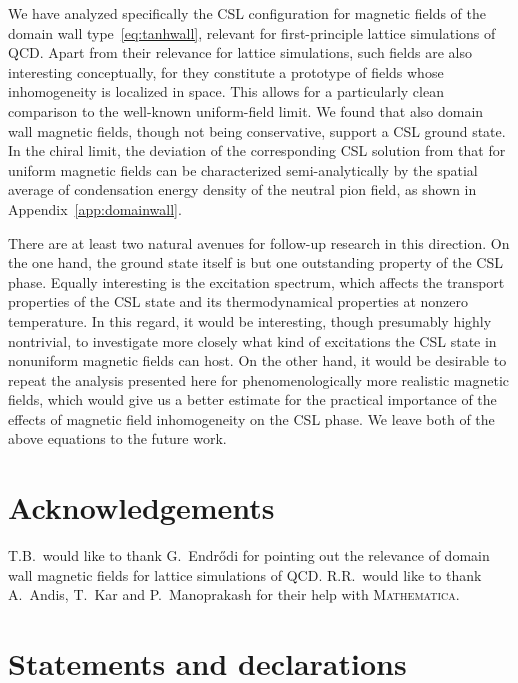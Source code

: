 \documentclass[pdflatex,iicol,sn-mathphys-num]{sn-jnl}
\begin{document}
We have analyzed specifically the CSL configuration for magnetic fields of the domain wall type~\eqref{eq:tanhwall}, relevant for first-principle lattice simulations of QCD. Apart from their relevance for lattice simulations, such fields are also interesting conceptually, for they constitute a prototype of fields whose inhomogeneity is localized in space. This allows for a particularly clean comparison to the well-known uniform-field limit. We found that also domain wall magnetic fields, though not being conservative, support a CSL ground state. In the chiral limit, the deviation of the corresponding CSL solution from that for uniform magnetic fields can be characterized semi-analytically by the spatial average of condensation energy density of the neutral pion field, as shown in Appendix~\ref{app:domainwall}.

There are at least two natural avenues for follow-up research in this direction. On the one hand, the ground state itself is but one outstanding property of the CSL phase. Equally interesting is the excitation spectrum, which affects the transport properties of the CSL state and its thermodynamical properties at nonzero temperature. In this regard, it would be interesting, though presumably highly nontrivial, to investigate more closely what kind of excitations the CSL state in nonuniform magnetic fields can host. On the other hand, it would be desirable to repeat the analysis presented here for phenomenologically more realistic magnetic fields, which would give us a better estimate for the practical importance of the effects of magnetic field inhomogeneity on the CSL phase. We leave both of the above equations to the future work.


\backmatter
\section*{Acknowledgements}

T.B.~would like to thank G.~Endr\H{o}di for pointing out the relevance of domain wall magnetic fields for lattice simulations of QCD. R.R.~would like to thank A.~Andis, T.~Kar and P.~Manoprakash for their help with \textsc{Mathematica}.


\section*{Statements and declarations}
\end{document}
